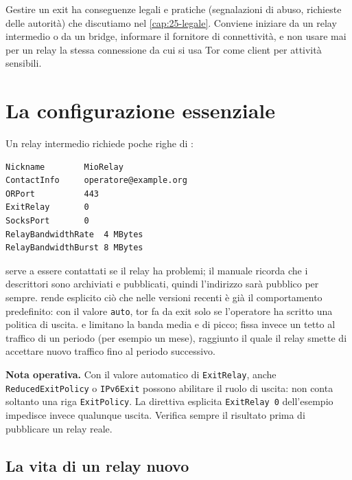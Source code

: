 \begin{attenzione}
Gestire un exit ha conseguenze legali e pratiche (segnalazioni di abuso, richieste delle autorità) che discutiamo nel \cref{cap:25-legale}. Conviene iniziare da un relay intermedio o da un bridge, informare il fornitore di connettività, e non usare mai per un relay la stessa connessione da cui si usa Tor come client per attività sensibili.
\end{attenzione}

\section{La configurazione essenziale}\label{sec:relay-config}

Un relay intermedio richiede poche righe di :
\begin{lstlisting}[numbers=none]
Nickname        MioRelay
ContactInfo     operatore@example.org
ORPort          443
ExitRelay       0
SocksPort       0
RelayBandwidthRate  4 MBytes
RelayBandwidthBurst 8 MBytes
\end{lstlisting}
 serve a essere contattati se il relay ha problemi; il manuale ricorda che i descrittori sono archiviati e pubblicati, quindi l'indirizzo sarà pubblico per sempre.  rende esplicito ciò che nelle versioni recenti è già il comportamento predefinito: con il valore \texttt{auto}, tor fa da exit solo se l'operatore ha scritto una politica di uscita.  e  limitano la banda media e di picco;  fissa invece un tetto al traffico di un periodo (per esempio un mese), raggiunto il quale il relay smette di accettare nuovo traffico fino al periodo successivo.

\textbf{Nota operativa.} Con il valore automatico di \texttt{ExitRelay}, anche \texttt{ReducedExitPolicy} o \texttt{IPv6Exit} possono abilitare il ruolo di uscita: non conta soltanto una riga \texttt{ExitPolicy}. La direttiva esplicita \texttt{ExitRelay 0} dell'esempio impedisce invece qualunque uscita. Verifica sempre il risultato prima di pubblicare un relay reale.

\subsection{La vita di un relay nuovo}


